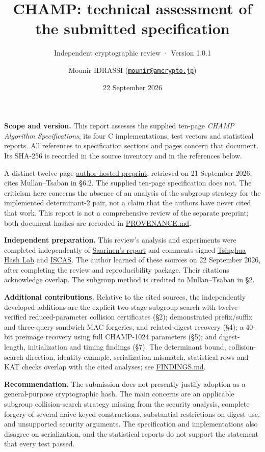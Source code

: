\documentclass[
  english,
  11pt,
  a4paper,
]{article}
\title{CHAMP: technical assessment of the submitted specification}
\subtitle{Independent cryptographic review · Version 1.0.1}
\author{Mounir IDRASSI
(\href{mailto:mounir@amcrypto.jp}{\nolinkurl{mounir@amcrypto.jp}})}
\date{22 September 2026}
\begin{document}
\maketitle

\textbf{Scope and version.} This report assesses the supplied ten-page
\emph{CHAMP Algorithm Specifications}, its four C implementations, test
vectors and statistical reports. All references to specification
sections and pages concern that document. Its SHA-256 is recorded in the
source inventory and in the references below.

A distinct twelve-page
\href{https://shpilrain.ccny.cuny.edu/Cayley\%20hash\%20paper.pdf}{author-hosted
preprint}, retrieved on 21 September 2026, cites Mullan--Tsaban in §6.2.
The supplied ten-page specification does not. The criticism here
concerns the absence of an analysis of the subgroup strategy for the
implemented determinant-2 pair, not a claim that the authors have never
cited that work. This report is not a comprehensive review of the
separate preprint; both document hashes are recorded in
\url{PROVENANCE.md}.

\textbf{Independent preparation.} This review's analysis and experiments
were completed independently of
\href{https://ngcc.dev/reports/hash-04.html}{Saarinen's report} and
comments signed
\href{https://list.niccs.org.cn/archives/list/crypthashforum@list.niccs.org.cn/message/QNMIAAKIPHG5FEK7QZEE2ZYBOWQHCZUE/}{Tsinghua
Hash Lab} and
\href{https://list.niccs.org.cn/archives/list/crypthashforum@list.niccs.org.cn/message/6LSOFTTMTDWFWWRAZDREDYJNG5NXDVEC/}{ISCAS}.
The author learned of these sources on 22 September 2026, after
completing the review and reproducibility package. Their citations
acknowledge overlap. The subgroup method is credited to Mullan--Tsaban
in §2.

\textbf{Additional contributions.} Relative to the cited sources, the
independently developed additions are the explicit two-stage subgroup
search with twelve verified reduced-parameter collision certificates
(§2); demonstrated prefix/suffix and three-query sandwich MAC forgeries,
and related-digest recovery (§4); a 40-bit preimage recovery using full
CHAMP-1024 parameters (§5); and digest-length, initialization and timing
findings (§7). The determinant bound, collision-search direction,
identity example, serialization mismatch, statistical rows and KAT
checks overlap with the cited analyses; see \url{FINDINGS.md}.

\textbf{Recommendation.} The submission does not presently justify
adoption as a general-purpose cryptographic hash. The main concerns are
an applicable subgroup collision-search strategy missing from the
security analysis, complete forgery of several naive keyed
constructions, substantial restrictions on digest use, and unsupported
security arguments. The specification and implementations also disagree
on serialization, and the statistical reports do not support the
statement that every test passed.
\end{document}
